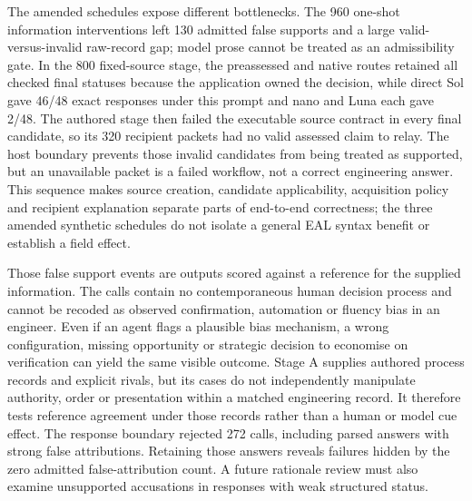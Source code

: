 \documentclass[preprint,12pt]{elsarticle}
\begin{document}
The amended schedules expose different bottlenecks. The 960 one-shot information interventions left 130 admitted false supports and a large valid-versus-invalid raw-record gap; model prose cannot be treated as an admissibility gate. In the 800 fixed-source stage, the preassessed and native routes retained all checked final statuses because the application owned the decision, while direct Sol gave 46/48 exact responses under this prompt and nano and Luna each gave 2/48. The authored stage then failed the executable source contract in every final candidate, so its 320 recipient packets had no valid assessed claim to relay. The host boundary prevents those invalid candidates from being treated as supported, but an unavailable packet is a failed workflow, not a correct engineering answer. This sequence makes source creation, candidate applicability, acquisition policy and recipient explanation separate parts of end-to-end correctness; the three amended synthetic schedules do not isolate a general EAL syntax benefit or establish a field effect.

Those false support events are outputs scored against a reference for the supplied information. The calls contain no contemporaneous human decision process and cannot be recoded as observed confirmation, automation or fluency bias in an engineer. Even if an agent flags a plausible bias mechanism, a wrong configuration, missing opportunity or strategic decision to economise on verification can yield the same visible outcome. Stage A supplies authored process records and explicit rivals, but its cases do not independently manipulate authority, order or presentation within a matched engineering record. It therefore tests reference agreement under those records rather than a human or model cue effect. The response boundary rejected 272 calls, including parsed answers with strong false attributions. Retaining those answers reveals failures hidden by the zero admitted false-attribution count. A future rationale review must also examine unsupported accusations in responses with weak structured status.
\end{document}
